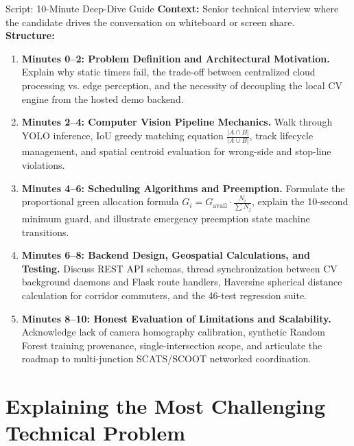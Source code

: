 \begin{interviewq}{Script: 10-Minute Deep-Dive Guide}
\textbf{Context:} Senior technical interview where the candidate drives the conversation on whiteboard or screen share.\\
\textbf{Structure:}
\begin{enumerate}
    \item \textbf{Minutes 0--2: Problem Definition and Architectural Motivation.} Explain why static timers fail, the trade-off between centralized cloud processing vs. edge perception, and the necessity of decoupling the local CV engine from the hosted demo backend.
    \item \textbf{Minutes 2--4: Computer Vision Pipeline Mechanics.} Walk through YOLO inference, IoU greedy matching equation $\frac{|A \cap B|}{|A \cup B|}$, track lifecycle management, and spatial centroid evaluation for wrong-side and stop-line violations.
    \item \textbf{Minutes 4--6: Scheduling Algorithms and Preemption.} Formulate the proportional green allocation formula $G_i = G_{\text{avail}} \cdot \frac{N_i}{\sum N_j}$, explain the 10-second minimum guard, and illustrate emergency preemption state machine transitions.
    \item \textbf{Minutes 6--8: Backend Design, Geospatial Calculations, and Testing.} Discuss REST API schemas, thread synchronization between CV background daemons and Flask route handlers, Haversine spherical distance calculation for corridor commuters, and the 46-test regression suite.
    \item \textbf{Minutes 8--10: Honest Evaluation of Limitations and Scalability.} Acknowledge lack of camera homography calibration, synthetic Random Forest training provenance, single-intersection scope, and articulate the roadmap to multi-junction SCATS/SCOOT networked coordination.
\end{enumerate}
\end{interviewq}

\section{Explaining the Most Challenging Technical Problem}
\label{sec:script_challenging_problem}

